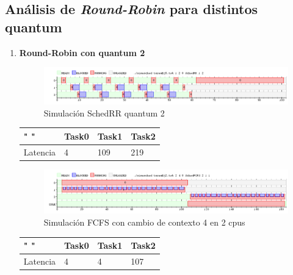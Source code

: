 \documentclass[11pt]{article}
\begin{document}
\subsection{Análisis de \textit{Round-Robin} para distintos quantum}
\begin{enumerate}
\item \textbf{Round-Robin con quantum 2}

      \begin{figure}[H]
        \includegraphics[scale=0.5]{Ej5q2}
        \caption{Simulación SchedRR quantum 2}
      \end{figure}

\begin{table}[htb]
\centering
\begin{tabular}{| l | l | l | l |}
\hline
" " & Task0 & Task1 & Task2 \\
\hline \hline
Latencia & 4 & 109 & 219 \\ \hline
\end{tabular}
\end{table}


  \begin{figure}[H]
    \includegraphics[scale=0.5]{Ejercicio2_2cpu}
    \caption{Simulación FCFS con cambio de contexto 4 en 2 cpus}
  \end{figure}

\begin{table}[htb]
\centering
\begin{tabular}{| l | l | l | l |}
\hline
" " & Task0 & Task1 & Task2 \\
\hline \hline
Latencia & 4 & 4 & 107 \\ \hline
\end{tabular}
\end{table}


\end{enumerate}
\end{document}
